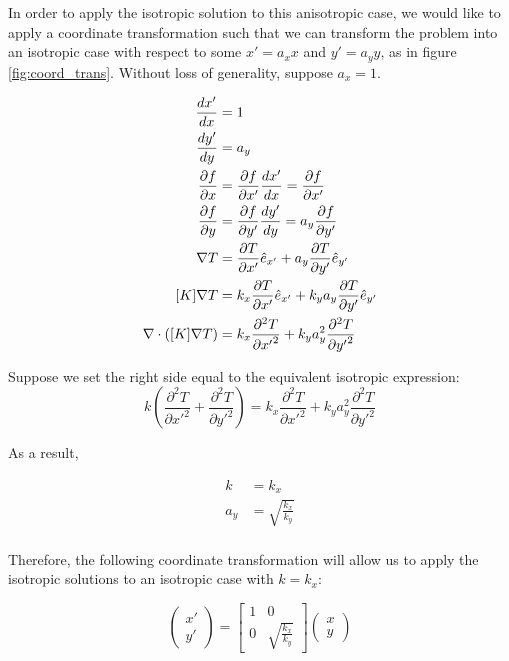 In order to apply the isotropic solution to this anisotropic case, we would like
to apply a coordinate transformation such that we can transform the problem into
an isotropic case with respect to some \(x' = a_x x\) and \(y' = a_y y\), as in
figure \ref{fig:coord_trans}.
Without loss of generality, suppose \(a_x = 1\).

\begin{align}
\frac{dx'}{dx} &= 1\\
\frac{dy'}{dy} &= a_y\\
\frac{\partial f}{\partial x} &= \frac{\partial f}{\partial x'}\frac{dx'}{dx} = \frac{\partial f}{\partial x'}\\
\frac{\partial f}{\partial y} &= \frac{\partial f}{\partial y'}\frac{dy'}{dy} = a_y\frac{\partial f}{\partial y'}\\
\nabla T &= \frac{\partial T}{\partial x'} \hat{e}_{x'} + a_y\frac{\partial T}{\partial y'} \hat{e}_{y'} \\
[K]\nabla T &= k_x\frac{\partial T}{\partial x'} \hat{e}_{x'} + k_ya_y\frac{\partial T}{\partial y'} \hat{e}_{y'}\\
\nabla \cdot \left([K]\nabla T\right) &= k_x\frac{\partial^2 T}{\partial {x'}^2} + k_ya_y^2\frac{\partial^2 T}{\partial {y'}^2}\\
\end{align}

Suppose we set the right side equal to the equivalent isotropic expression:
\begin{equation*}
k\left(\frac{\partial^2 T}{\partial {x'}^2} + \frac{\partial^2 T}{\partial {y'}^2} \right) = k_x\frac{\partial^2 T}{\partial {x'}^2} + k_ya_y^2\frac{\partial^2 T}{\partial {y'}^2}
\end{equation*}

As a result,

\begin{align*}
k &= k_x\\ a_y &= \sqrt{\frac{k_x}{k_y}}\\
\end{align*}

Therefore, the following coordinate transformation will allow us to apply the
isotropic solutions to an isotropic case with \(k = k_x\):

\begin{equation}
    \label{coord_trans}
    \begin{pmatrix}x' \\ y'\end{pmatrix} =
    \begin{bmatrix}1 & 0\\ 0 & \sqrt{\frac{k_x}{k_y}} \end{bmatrix}\begin{pmatrix}x \\ y\end{pmatrix}
\end{equation}

